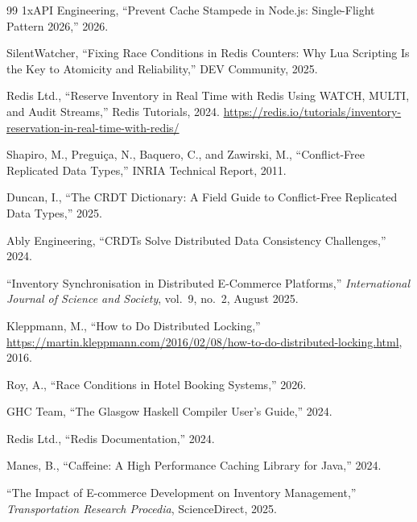 \documentclass[12pt,a4paper,oneside]{report}
\begin{document}
\begin{thebibliography}{99}
1xAPI Engineering,
``Prevent Cache Stampede in Node.js: Single-Flight Pattern 2026,''
2026.

SilentWatcher,
``Fixing Race Conditions in Redis Counters: Why Lua Scripting Is the Key to Atomicity and Reliability,''
DEV Community, 2025.

Redis Ltd.,
``Reserve Inventory in Real Time with Redis Using WATCH, MULTI, and Audit Streams,''
Redis Tutorials, 2024. \url{https://redis.io/tutorials/inventory-reservation-in-real-time-with-redis/}

Shapiro, M., Pregui\c{c}a, N., Baquero, C., and Zawirski, M.,
``Conflict-Free Replicated Data Types,''
INRIA Technical Report, 2011.

Duncan, I.,
``The CRDT Dictionary: A Field Guide to Conflict-Free Replicated Data Types,''
2025.

Ably Engineering,
``CRDTs Solve Distributed Data Consistency Challenges,''
2024.

``Inventory Synchronisation in Distributed E-Commerce Platforms,''
\textit{International Journal of Science and Society}, vol.\ 9, no.\ 2, August 2025.

Kleppmann, M.,
``How to Do Distributed Locking,''
\url{https://martin.kleppmann.com/2016/02/08/how-to-do-distributed-locking.html}, 2016.

Roy, A.,
``Race Conditions in Hotel Booking Systems,''
2026.

GHC Team,
``The Glasgow Haskell Compiler User's Guide,''
2024.

Redis Ltd.,
``Redis Documentation,''
2024.

Manes, B.,
``Caffeine: A High Performance Caching Library for Java,''
2024.

``The Impact of E-commerce Development on Inventory Management,''
\textit{Transportation Research Procedia}, ScienceDirect, 2025.

\end{thebibliography}
\end{document}
